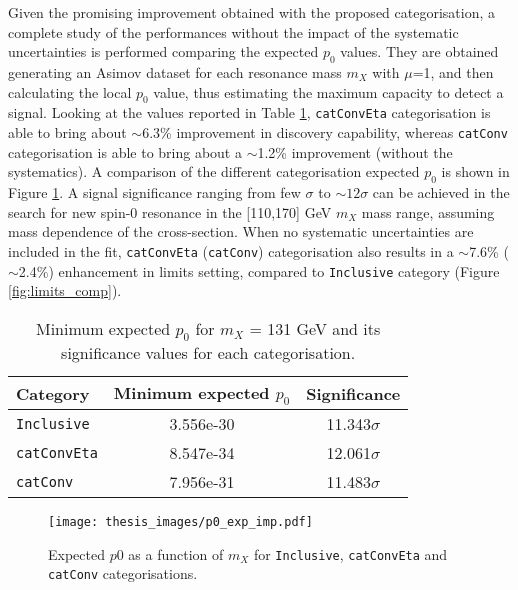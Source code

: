 \documentclass[a4paper, oneside, 11pt, openright]{book}
\begin{document}
 			Given the promising improvement obtained with the proposed categorisation, a complete study of the performances without the impact of the systematic uncertainties is performed comparing the expected  $p_0$ values. They are obtained generating an Asimov dataset for each resonance mass $m_X$ with $\mu$=1, and then calculating the local $p_0$ value, thus estimating the maximum capacity to detect a signal. %
 			Looking at the values reported in Table \ref{tab:p0_imp}, \texttt{catConvEta} categorisation  is able to bring about $\sim$6.3\% improvement in discovery capability, whereas \texttt{catConv} categorisation is able to bring about a $\sim$1.2\% improvement (without the systematics). 
 			A comparison of the different categorisation expected $p_0$ is shown in Figure \ref{fig:p0_comp}. A signal significance ranging from few $\sigma$ to $\sim12\sigma$ can be achieved in the search for new spin-0 resonance in the [110,170] GeV $m_X$ mass range, assuming mass dependence of the cross-section.  When no systematic uncertainties are included in the fit, \texttt{catConvEta} (\texttt{catConv}) categorisation also results in a $\sim$7.6\% ($\sim$2.4\%) enhancement in limits setting, compared to \texttt{Inclusive} category (Figure \ref{fig:limits_comp}).
 			\begin{table}[tbp]
				\centering
				\begin{tabular}{lcc}
					\toprule[1.5pt]
					Category 			& Minimum expected $p_0$ 	& Significance		\\
					\midrule
					\texttt{Inclusive}	& 3.556e-30					& 11.343$\sigma$	\\
					\texttt{catConvEta}	& 8.547e-34					& 12.061$\sigma$	\\
					\texttt{catConv}	& 7.956e-31					& 11.483$\sigma$ 	\\
					\bottomrule[1.5pt]
				\end{tabular}
 				\caption{Minimum expected $p_0$ for $m_X$ = 131 GeV and its significance values for each categorisation.}
 				\label{tab:p0_imp}
 			\end{table}
 			\begin{figure}
 				\centering
 				\texttt{[image: thesis\_images/p0\_exp\_imp.pdf]}
 				\caption{Expected $p0$ as a function of $m_X$ for \texttt{Inclusive}, \texttt{catConvEta} and \texttt{catConv} categorisations.}
 				\label{fig:p0_comp}
 			\end{figure}
\end{document}
